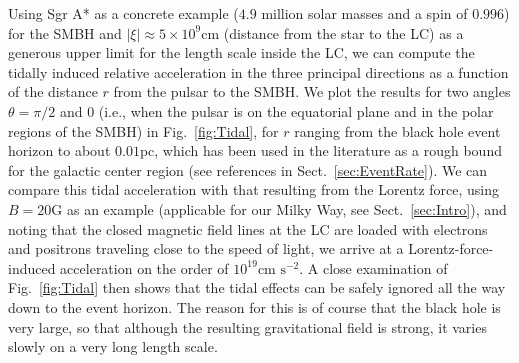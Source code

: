 \documentclass{aa}
\begin{document}
Using Sgr A* as a concrete example ($4.9$ million solar masses and a spin of $0.996$) for the SMBH and $|\xi| \approx 5\times 10^9$cm (distance from the star to the LC) as a generous upper limit for the length scale inside the LC, we can compute the tidally induced relative acceleration in the three principal directions as a function of the distance $r$ from the pulsar to the SMBH. We plot the results for two angles $\theta =\pi/2$ and $0$ (i.e., when the pulsar is on the equatorial plane and in the polar regions of the SMBH) in Fig.~\ref{fig:Tidal}, for $r$ ranging from the black hole event horizon to about $0.01$pc, which has been used in the literature as a rough bound for the galactic center region (see references in Sect.~\ref{sec:EventRate}). We can compare this tidal acceleration with that resulting from the Lorentz force, using $B=20$G as an example (applicable for our Milky Way, see Sect.~\ref{sec:Intro}), and noting that the closed magnetic field lines at the LC are loaded with electrons and positrons traveling close to the speed of light, we arrive at a Lorentz-force-induced acceleration on the order of $10^{19}\text{cm s}^{-2}$. A close examination of Fig.~\ref{fig:Tidal} then shows that the tidal effects can be safely ignored all the way down to the event horizon. The reason for this is of course that the black hole is very large, so that although the resulting gravitational field is strong, it varies slowly on a very long length scale. 
\end{document}
